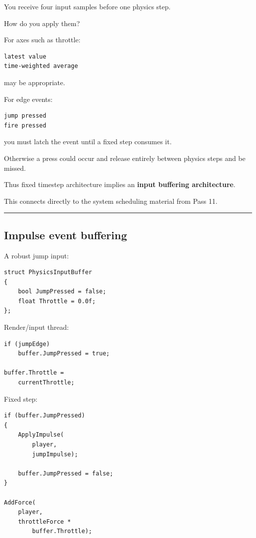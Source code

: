 You receive four input samples before one physics step.

How do you apply them?

For axes such as throttle:

\begin{verbatim}
latest value
time-weighted average
\end{verbatim}

may be appropriate.

For edge events:

\begin{verbatim}
jump pressed
fire pressed
\end{verbatim}

you must latch the event until a fixed step consumes it.

Otherwise a press could occur and release entirely between physics steps and be missed.

Thus fixed timestep architecture implies an \textbf{input buffering architecture}.

This connects directly to the system scheduling material from Pass 11.

\begin{center}\rule{0.5\linewidth}{0.5pt}\end{center}

\subsection{Impulse event buffering}\label{06-engine-ii-ch038-impulse-event-buffering}

\hypertarget{06-engine-ii-ch038-impulse-event-buffering}{}

A robust jump input:

\begin{verbatim}
struct PhysicsInputBuffer
{
    bool JumpPressed = false;
    float Throttle = 0.0f;
};
\end{verbatim}

Render/input thread:

\begin{verbatim}
if (jumpEdge)
    buffer.JumpPressed = true;

buffer.Throttle =
    currentThrottle;
\end{verbatim}

Fixed step:

\begin{verbatim}
if (buffer.JumpPressed)
{
    ApplyImpulse(
        player,
        jumpImpulse);

    buffer.JumpPressed = false;
}

AddForce(
    player,
    throttleForce *
        buffer.Throttle);
\end{verbatim}

